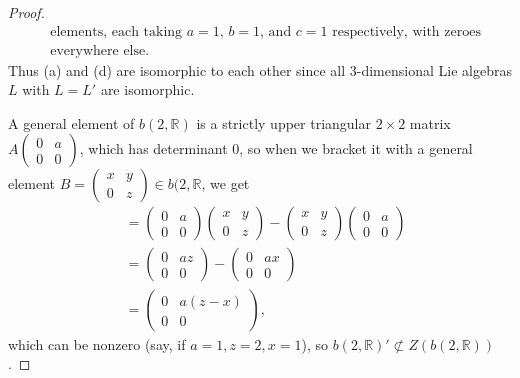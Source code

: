 \documentclass[12pt]{article}
\theoremstyle{definition}
\begin{document}
\begin{proof}
\begin{equation*}
\begin{array}{r|l}
        & \text{elements, each taking $a = 1$, $b = 1$, and $c = 1$ respectively, with zeroes}                                                   \\
                               & \text{everywhere else.}
		\end{array}
	\end{equation*}
  Thus (a) and (d) are isomorphic to each other since all 3-dimensional Lie algebras $L$ with $L = L'$ are isomorphic.
  
  A general element of $b(2, \mathbb{R})$ is a strictly upper triangular $2 \times 2$ matrix $A \begin{pmatrix} 0 & a \\ 0 & 0\end{pmatrix}$, which has determinant 0, so when we bracket it with a general element $B = \begin{pmatrix} x & y \\ 0 & z \end{pmatrix} \in b(2, \mathbb{R}$, we get \begin{align*}
      [A, B] & = \begin{pmatrix} 0 & a \\ 0 & 0 \end{pmatrix} \begin{pmatrix} x & y \\ 0 & z \end{pmatrix} - \begin{pmatrix} x & y \\ 0 & z \end{pmatrix} \begin{pmatrix} 0 & a \\ 0 & 0 \end{pmatrix} \\
      & = \begin{pmatrix} 0 & az \\ 0 & 0 \end{pmatrix} - \begin{pmatrix} 0 & ax \\ 0 & 0 \end{pmatrix} \\
      & = \begin{pmatrix} 0 & a(z - x) \\ 0 & 0 \end{pmatrix},
  \end{align*}
  which can be nonzero (say, if $a = 1, z = 2, x = 1$), so $b(2, \mathbb{R})' \not\subset Z(b(2, \mathbb{R}))$.


\end{proof}
\end{document}
